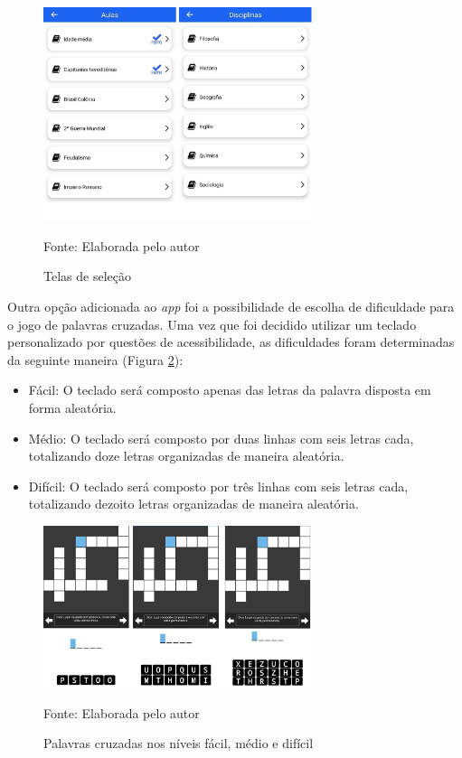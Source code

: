 \begin{figure}[H]
\centering
    \caption{Telas de seleção}
    \label{fig:telas-selecao}
    \includegraphics[width=0.7\textwidth]{Figuras/telas-selecao.jpg}
    
    Fonte: Elaborada pelo autor
\end{figure}

Outra opção adicionada ao \textit{app} foi a possibilidade de escolha de dificuldade para o jogo de palavras cruzadas. Uma vez que foi decidido utilizar um teclado personalizado por questões de acessibilidade, as dificuldades foram determinadas da seguinte maneira (Figura \ref{fig:dificuldades}):
\begin{itemize}
    \item Fácil: O teclado será composto apenas das letras da palavra disposta em forma aleatória.
    
    \item Médio: O teclado será composto por duas linhas com seis letras cada, totalizando doze letras organizadas de maneira aleatória.
    
    \item Difícil: O teclado será composto por três linhas com seis letras cada, totalizando dezoito letras organizadas de maneira aleatória.
\end{itemize}

\begin{figure}[H]
\centering
    \caption{Palavras cruzadas nos níveis fácil, médio e difícil}
    \label{fig:dificuldades}
    \includegraphics[width=0.7\textwidth]{Figuras/dificuldades.jpg}
    
    Fonte: Elaborada pelo autor
\end{figure}

